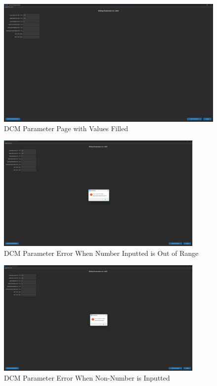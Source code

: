 \documentclass{article}
\begin{document}
\begin{tcolorbox}
    \begin{figure}[H]\label{genparam}
        \centering
        \includegraphics[width=\textwidth]{genparams.png}
        \caption{DCM Parameter Page with Values Filled}
    \end{figure}
\end{tcolorbox}

\begin{tcolorbox}
    \begin{figure}[H]\label{rangeparam}
        \centering
        \includegraphics[width=0.9\textwidth]{rangeparam.png}
        \caption{DCM Parameter Error When Number Inputted is Out of Range}
    \end{figure}
\end{tcolorbox}


\begin{tcolorbox}
    \begin{figure}[H]\label{numparam}
        \centering
        \includegraphics[width=0.9\textwidth]{numparam.png}
        \caption{DCM Parameter Error When Non-Number is Inputted}
    \end{figure}
\end{tcolorbox}
\end{document}
